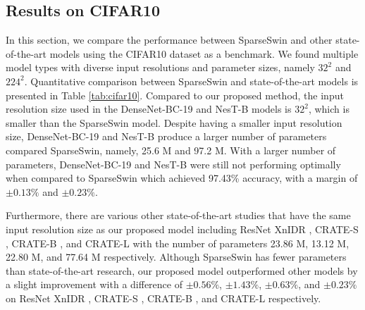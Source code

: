 \documentclass[runningheads]{llncs}
\begin{document}
\begin{table}[bp]
\extracolsep{\fill}
\def\arraystretch{1.25}\centering
\large
\caption{Quantitative Comparison on ImageNet100}
\label{tab:imagenet100}
\end{table}

\subsection{Results on CIFAR10}
\label{sec:cifar10}
In this section, we compare the performance between SparseSwin and other state-of-the-art models using the CIFAR10 dataset as a benchmark. We found multiple model types with diverse input resolutions and parameter sizes, namely $32^2$ and $224^2$. Quantitative comparison between SparseSwin and state-of-the-art models is presented in Table \ref{tab:cifar10}. Compared to our proposed method, the input resolution size used in the DenseNet-BC-19 \cite{zhang2017mixup} and NesT-B \cite{zhang2022nested} models is $32^2$, which is smaller than the SparseSwin model. Despite having a smaller input resolution size, DenseNet-BC-19 and NesT-B produce a larger number of parameters compared SparseSwin, namely, 25.6 M and 97.2 M. With a larger number of parameters, DenseNet-BC-19 and NesT-B were still not performing optimally when compared to SparseSwin which achieved 97.43\% accuracy, with a margin of $\pm0.13\%$ and $\pm0.23\%$. 

Furthermore, there are various other state-of-the-art studies that have the same input resolution size as our proposed model including ResNet XnIDR \cite{sun2021xnodr}, CRATE-S \cite{yu2023white}, CRATE-B \cite{yu2023white}, and CRATE-L \cite{yu2023white} with the number of parameters 23.86 M, 13.12 M, 22.80 M, and 77.64 M respectively. Although SparseSwin has fewer parameters than state-of-the-art research, our proposed model outperformed other models by a slight improvement with a difference of $\pm0.56\%$, $\pm1.43\%$, $\pm0.63\%$, and $\pm0.23\%$ on ResNet XnIDR \cite{sun2021xnodr}, CRATE-S \cite{yu2023white}, CRATE-B \cite{yu2023white}, and CRATE-L \cite{yu2023white} respectively. 
\end{document}
